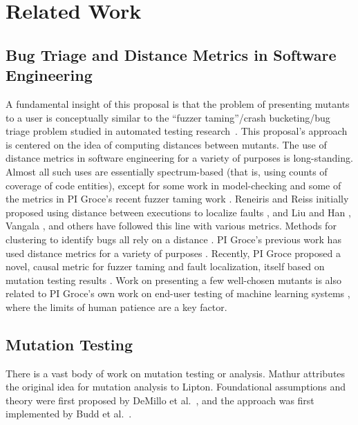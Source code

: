 \section{Related Work}

\subsection{Bug Triage and Distance Metrics in Software Engineering}

A fundamental insight of this proposal is that the problem of
presenting mutants to a user is conceptually similar to the ``fuzzer
taming''/crash bucketing/bug triage problem studied in automated
testing research~\cite{PLDI13,SemCrash}.  This proposal's approach is centered on
the idea of computing distances between mutants.  The use of distance metrics in software engineering for a variety of
purposes is long-standing.  Almost all such uses are
essentially spectrum-based \cite{RepsSpectra} (that is, using counts
of coverage of code entities), except for some work in model-checking
\cite{GroceDist,ChakiLev} and some of the metrics in PI Groce's recent fuzzer
taming work \cite{PLDI13}.  Reneiris and Reiss initially proposed
using distance between executions to localize faults
\cite{NearNeighbor}, and Liu and Han \cite{Liu06}, Vangala \cite{VangalaDist}, and others have
followed this line with various metrics. %
Methods for clustering to identify bugs all rely on a distance \cite{Podgurski04}.  PI Groce's previous work
has used distance metrics for a variety of purposes
\cite{PLDI13,icst2014,issta14}.  Recently, PI Groce proposed a novel,
causal metric for fuzzer taming and fault localization, itself based on
mutation testing results \cite{distMut}.  Work on
presenting a few well-chosen mutants
is also related to PI Groce's own work on end-user testing of machine learning
systems \cite{EndUserMistake,OnlyOracle}, where the limits of human
patience are a key factor.


\subsection{Mutation Testing}

There is a vast body of work on mutation testing or analysis.  Mathur attributes~\cite{mathur2012foundations} the original idea for mutation analysis
to Lipton. Foundational assumptions and
theory were first proposed by DeMillo et al.~\cite{demillo1978hints},
and the approach was first implemented by Budd et al.~\cite{budd1980theoretical}.

